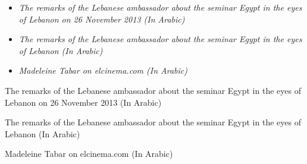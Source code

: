 \begin{itemize}
\item
  \emph{The remarks of the Lebanese ambassador about the seminar Egypt
  in the eyes of Lebanon on 26 November 2013 (In Arabic)}
\item
  \emph{The remarks of the Lebanese ambassador about the seminar Egypt
  in the eyes of Lebanon (In Arabic)}
\item
  \emph{Madeleine Tabar on elcinema.com (In Arabic)}
\end{itemize}

The remarks of the Lebanese ambassador about the seminar Egypt in the
eyes of Lebanon on 26 November 2013 (In Arabic)

The remarks of the Lebanese ambassador about the seminar Egypt in the
eyes of Lebanon (In Arabic)

Madeleine Tabar on elcinema.com (In Arabic)
